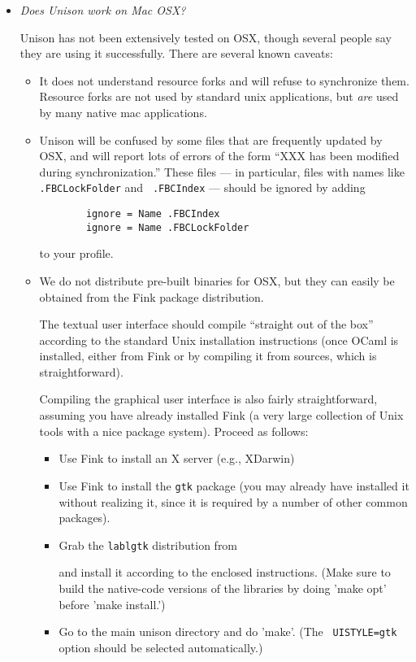 
\begin{itemize}
\item {\em Does Unison work on Mac OSX?}

Unison has not been extensively tested on OSX, though several people say
they are using it successfully.  There are several known caveats:

\begin{itemize}
\item It does not understand resource forks and will refuse to synchronize
them.  Resource forks are not used by standard unix applications, but 
{\em are} used by many native mac applications.

\item Unison will be confused by some files that are frequently updated
by OSX, and will report lots of errors of the form ``XXX has been
modified during synchronization.''  These files --- 
in particular, files with names like {\tt .FBCLockFolder} and {\tt
  .FBCIndex} --- should be ignored by adding 
\begin{verbatim}
        ignore = Name .FBCIndex
        ignore = Name .FBCLockFolder
\end{verbatim}
to your profile.

\item We do not distribute pre-built binaries for OSX, but they can easily be
obtained from the Fink package distribution.

The textual user interface should compile ``straight out of the box''
according to the standard Unix installation instructions (once OCaml is
installed, either from Fink or by compiling it from sources, which is
straightforward).   

Compiling the graphical user interface is also fairly straightforward,
assuming you have already installed Fink (a very large collection of Unix
tools with a nice package system).  Proceed as follows:
\begin{itemize}
\item Use Fink to install an X server (e.g., XDarwin)
\item Use Fink to install the {\tt gtk} package (you may already have
installed it without realizing it, since it is required by a number of
other common packages).
\item Grab the {\tt lablgtk} distribution from 
\begin{quote}
\end{quote}
and install it according to the enclosed instructions.  (Make sure to
build the native-code versions of the libraries by doing 'make opt'
before 'make install.')
\item Go to the main unison directory and do 'make'.  (The {\tt
  UISTYLE=gtk} option should be selected automatically.)
\end{itemize}
\end{itemize}


\end{itemize}
